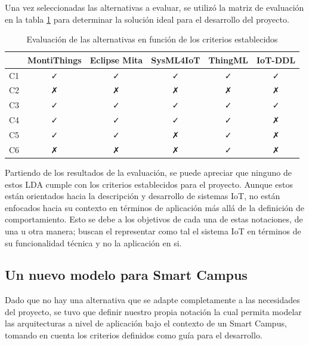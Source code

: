 Una vez seleccionadas las alternativas a evaluar, se utilizó la matriz de evaluación en la tabla \ref{tab:evaluation} para determinar la solución ideal para el desarrollo del proyecto. 

\skipline
\skipline
\skipline
\skipline

\begin{table}[H]
    \centering
    \caption{Evaluación de las alternativas en función de los criterios establecidos} \label{tab:evaluation}
    \begin{tabular}{cccccc}
    \hline
    \multicolumn{1}{l}{} &
      \multicolumn{1}{l}{MontiThings} &
      \multicolumn{1}{l}{Eclipse Mita} &
      \multicolumn{1}{l}{SysML4IoT} &
      \multicolumn{1}{l}{ThingML} &
      \multicolumn{1}{l}{IoT-DDL} \\ \hline
      C1 & ✓ & ✓ & ✓ & ✓ & ✓ \\
      C2 & ✗ & ✗ & ✗ & ✗ & ✗ \\
      C3 & ✓ & ✓ & ✓ & ✓ & ✓ \\
      C4 & ✓ & ✓ & ✓ & ✓ & ✗ \\
      C5 & ✓ & ✓ & ✗ & ✓ & ✗ \\
      C6 & ✗ & ✗ & ✗ & ✓ & ✗ \\ \hline
    \end{tabular}
\end{table}

Partiendo de los resultados de la evaluación, se puede apreciar que ninguno de estos LDA cumple con los criterios establecidos para el proyecto. Aunque estos están orientados hacia la descripción y desarrollo de sistemas IoT, no están enfocados hacia su contexto en términos de aplicación más allá de la definición de comportamiento. Esto se debe a los objetivos de cada una de estas notaciones, de una u otra manera; buscan el representar como tal el sistema IoT en términos de su funcionalidad técnica y no la aplicación en si. 

\subsection{Un nuevo modelo para Smart Campus}

Dado que no hay una alternativa que se adapte completamente a las necesidades del proyecto, se tuvo que definir nuestro propia notación la cual permita modelar las arquitecturas a nivel de aplicación bajo el contexto de un Smart Campus, tomando en cuenta los criterios definidos como guía para el desarrollo.

